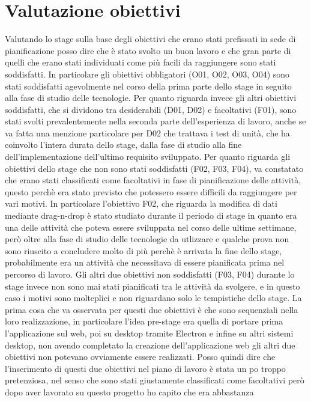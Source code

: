 \section{Valutazione obiettivi}
\label{sec:prodotto-ottenuto}
Valutando lo stage sulla base degli obiettivi che erano stati prefissati in sede di pianificazione posso dire che è stato svolto un buon lavoro e che gran parte di quelli
che erano stati individuati come più facili da raggiungere sono stati soddisfatti. In particolare gli obiettivi obbligatori (O01, O02, O03, O04) sono stati soddisfatti agevolmente
nel corso della prima parte dello stage in seguito alla fase di studio delle tecnologie. Per quanto riguarda invece gli altri obiettivi soddisfatti, che si dividono tra
desiderabili (D01, D02) e facoltativi (F01), sono stati svolti prevalentemente nella seconda parte dell'esperienza di lavoro, anche se va fatta una menzione particolare per
D02 che trattava i test di unità, che ha coinvolto l'intera durata dello stage, dalla fase di studio alla fine dell'implementazione dell'ultimo requisito sviluppato.
Per quanto riguarda gli obiettivi dello stage che non sono stati soddisfatti (F02, F03, F04), va constatato che erano stati classificati come facoltativi in fase di pianificazione delle attività,
questo perchè era stato previsto che potessero essere difficili da raggiungere per vari motivi. In particolare l'obiettivo F02, che riguarda la modifica di dati mediante drag-n-drop è
stato studiato durante il periodo di stage in quanto era una delle attività che poteva essere sviluppata nel corso delle ultime settimane, però oltre alla fase di studio delle tecnologie da
utlizzare e qualche prova non sono riuscito a concludere molto di più perchè è arrivata la fine dello stage, probabilmente era un attività che necessitava di essere pianificata prima nel percorso di lavoro.
Gli altri due obiettivi non soddisfatti (F03, F04) durante lo stage invece non sono mai stati pianificati tra le attività da svolgere, e in questo caso i motivi sono molteplici e non
riguardano solo le tempistiche dello stage. La prima cosa che va osservata per questi due obiettivi è che sono sequenziali nella loro realizzazione, in particolare
l'idea pre-stage era quella di portare prima l'applicazione sul web, poi su desktop tramite Electron e infine su altri sistemi desktop, non avendo completato la creazione
dell'applicazione web gli altri due obiettivi non potevano ovviamente essere realizzati. Posso quindi dire che l'inserimento di questi due obiettivi nel piano di lavoro è
stata un po troppo pretenziosa, nel senso che sono stati giustamente classificati come facoltativi però dopo aver lavorato su questo progetto ho capito che era abbastanza
